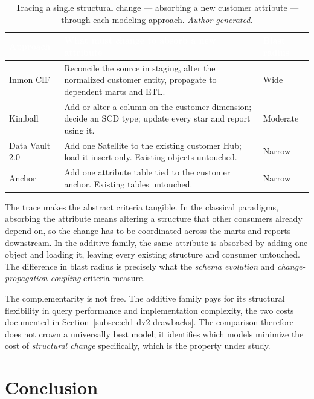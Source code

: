\begin{table}[H]
\centering
\renewcommand{\arraystretch}{1.35}
\caption{Tracing a single structural change --- absorbing a new customer attribute --- through each modeling approach. \textit{Author-generated.}}
\label{tab:ch1-tracing}
\begin{tabularx}{\linewidth}{|>{\raggedright\arraybackslash}p{2.9cm}|>{\raggedright\arraybackslash}X|>{\raggedright\arraybackslash}p{2.4cm}|}
\hline
\rowcolor{tblheader}
\textcolor{white}{\textbf{Approach}} &
\textcolor{white}{\textbf{What must change to absorb a new attribute}} &
\textcolor{white}{\textbf{Blast radius}} \\
\hline
Inmon CIF & Reconcile the source in staging, alter the normalized customer entity, propagate to dependent marts and ETL. & Wide \\
Kimball & Add or alter a column on the customer dimension; decide an SCD type; update every star and report using it. & Moderate \\
Data Vault 2.0 & Add one Satellite to the existing customer Hub; load it insert-only. Existing objects untouched. & Narrow \\
Anchor & Add one attribute table tied to the customer anchor. Existing tables untouched. & Narrow \\
\hline
\end{tabularx}
\end{table}

The trace makes the abstract criteria tangible. In the classical paradigms, absorbing the attribute means altering a structure that other consumers already depend on, so the change has to be coordinated across the marts and reports downstream. In the additive family, the same attribute is absorbed by adding one object and loading it, leaving every existing structure and consumer untouched. The difference in blast radius is precisely what the \textit{schema evolution} and \textit{change-propagation coupling} criteria measure.

The complementarity is not free. The additive family pays for its structural flexibility in query performance and implementation complexity, the two costs documented in Section~\ref{subsec:ch1-dv2-drawbacks}. The comparison therefore does not crown a universally best model; it identifies which models minimize the cost of \textit{structural change} specifically, which is the property under study.

\section*{Conclusion}


